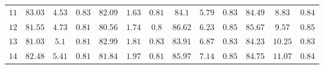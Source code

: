\begin{table}
{\begin{tabular}{@{}ccccccccccccc@{}}
			$11$                               & $\mathbf{83.03}$          & $\mathbf{4.53}$           & $\mathbf{0.83}$     & $82.09$      & $1.63$      & $0.81$ & $84.1$       & $5.79$      & $0.83$ & $84.49$      & $8.83$      & $0.84$ \\
			$12$                               & $81.55$          & $4.73$           & $0.81$     & $80.56$      & $1.74$      & $0.8$  & $\mathbf{86.62}$      & $\mathbf{6.23}$      & $\mathbf{0.85}$ & $\mathbf{85.67}$      & $\mathbf{9.57}$      & $\mathbf{0.85}$ \\
			$13$                               & $81.03$          & $5.1$            & $0.81$     & $\mathbf{82.99}$      & $\mathbf{1.81}$      & $\mathbf{0.83}$ & $83.91$      & $6.87$      & $0.83$ & $84.23$      & $10.25$     & $0.83$ \\
			$14$                               & $82.48$          & $5.41$           & $0.81$     & $81.84$      & $1.97$      & $0.81$ & $85.97$      & $7.14$      & $0.85$ & $84.75$      & $11.07$     & $0.84$ \\ \bottomrule[1.25pt]
	\end{tabular}}
\end{table}


